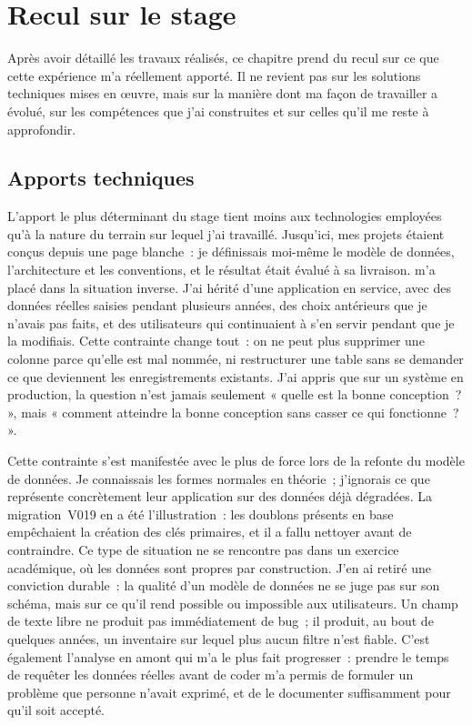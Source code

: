 \chapter{Recul sur le stage}
\label{chap:recul}

Après avoir détaillé les travaux réalisés, ce chapitre prend du recul sur ce que
cette expérience m'a réellement apporté. Il ne revient pas sur les solutions
techniques mises en \oe uvre, mais sur la manière dont ma façon de travailler a
évolué, sur les compétences que j'ai construites et sur celles qu'il me reste à
approfondir.

\section{Apports techniques}
\label{sec:apports-techniques}

L'apport le plus déterminant du stage tient moins aux technologies employées
qu'à la nature du terrain sur lequel j'ai travaillé. Jusqu'ici, mes projets
étaient conçus depuis une page blanche~: je définissais moi-même le modèle de
données, l'architecture et les conventions, et le résultat était évalué à sa
livraison. \csbag m'a placé dans la situation inverse. J'ai hérité d'une
application en service, avec des données réelles saisies pendant plusieurs
années, des choix antérieurs que je n'avais pas faits, et des utilisateurs qui
continuaient à s'en servir pendant que je la modifiais. Cette contrainte change
tout~: on ne peut plus supprimer une colonne parce qu'elle est mal nommée, ni
restructurer une table sans se demander ce que deviennent les enregistrements
existants. J'ai appris que sur un système en production, la question n'est
jamais seulement « quelle est la bonne conception~? », mais « comment atteindre
la bonne conception sans casser ce qui fonctionne~? ».

Cette contrainte s'est manifestée avec le plus de force lors de la refonte du
modèle de données. Je connaissais les formes normales en théorie~; j'ignorais ce
que représente concrètement leur application sur des données déjà dégradées. La
migration~V019 en a été l'illustration~: les doublons présents en base
empêchaient la création des clés primaires, et il a fallu nettoyer avant de
contraindre. Ce type de situation ne se rencontre pas dans un exercice
académique, où les données sont propres par construction. J'en ai retiré une
conviction durable~: la qualité d'un modèle de données ne se juge pas sur son
schéma, mais sur ce qu'il rend possible ou impossible aux utilisateurs. Un champ
de texte libre ne produit pas immédiatement de bug~; il produit, au bout de
quelques années, un inventaire sur lequel plus aucun filtre n'est fiable. C'est
également l'analyse en amont qui m'a le plus fait progresser~: prendre le temps
de requêter les données réelles avant de coder m'a permis de formuler un
problème que personne n'avait exprimé, et de le documenter suffisamment pour
qu'il soit accepté.

